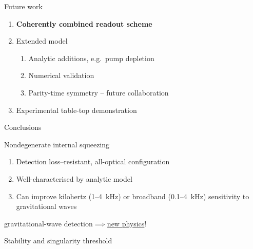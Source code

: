 \documentclass[12pt,xcolor=dvipsnames,aspectratio=169]{beamer}
\begin{document}
\begin{frame}{Future work}
	\begin{enumerate}
	\item \textbf{Coherently combined readout scheme} %
	\item Extended model %
		\begin{enumerate}
		\item Analytic additions, e.g.\ pump depletion
		\item Numerical validation %
		\item Parity-time symmetry -- future collaboration
		\end{enumerate}
	\item Experimental table-top demonstration 
	\end{enumerate}
\end{frame}

\begin{frame}{Conclusions}
\begin{block}{Nondegenerate internal squeezing}
\begin{enumerate}
\item Detection loss--resistant, all-optical configuration
\item Well-characterised by analytic model
\item Can improve kilohertz (1--4~kHz) or broadband (0.1--4~kHz) sensitivity to gravitational waves 
\end{enumerate}
\end{block}
\vspace{0.5cm}
{
	\begin{block}{}
	\centering
	{\large gravitational-wave detection$\implies$\underline{new physics}!}
	\end{block}
}
\end{frame}

{
\begin{frame}[noframenumbering]
\end{frame}}


\begin{frame}[noframenumbering]{Stability and singularity threshold}
\centering
\end{frame}
\end{document}
